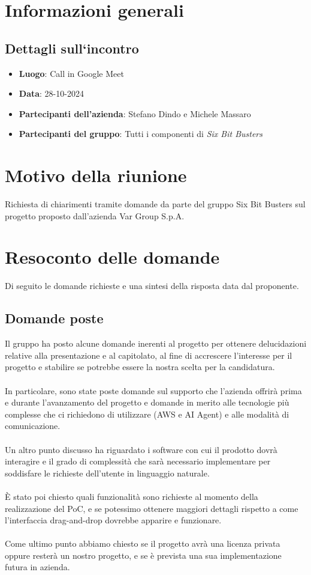 \section{Informazioni generali}
\subsection{Dettagli sull`incontro}
\begin{itemize}
    \item \textbf{Luogo}: Call in Google Meet
    \item \textbf{Data}: 28-10-2024
    \item \textbf{Partecipanti dell'azienda}: Stefano Dindo e Michele Massaro
    \item \textbf{Partecipanti del gruppo}: Tutti i componenti di \textit{Six Bit Busters} 
\end{itemize}

\section{Motivo della riunione}
Richiesta di chiarimenti tramite domande da parte del gruppo Six Bit Busters sul progetto proposto dall'azienda Var Group S.p.A.

\section{Resoconto delle domande}
Di seguito le domande richieste e una sintesi della risposta data dal proponente.

\subsection{Domande poste}
Il gruppo ha posto alcune domande inerenti al progetto per ottenere delucidazioni relative alla presentazione e al capitolato, al fine di accrescere l'interesse per il progetto e stabilire se potrebbe essere la nostra scelta per la candidatura.\\
\\
In particolare, sono state poste domande sul supporto che l’azienda offrirà prima e durante l'avanzamento del progetto e domande in merito alle tecnologie più complesse che ci richiedono di utilizzare (AWS e AI Agent) e alle modalità di comunicazione.\\
\\
Un altro punto discusso ha riguardato i software con cui il prodotto dovrà interagire e il grado di complessità che sarà necessario implementare per soddisfare le richieste dell'utente in linguaggio naturale.\\
\\
È stato poi chiesto quali funzionalità sono richieste al momento della realizzazione del PoC, e se potessimo ottenere maggiori dettagli rispetto a come l'interfaccia drag-and-drop dovrebbe apparire e funzionare.\\
\\
Come ultimo punto abbiamo chiesto se il progetto avrà una licenza privata oppure resterà un nostro progetto, e se è prevista una sua implementazione futura in azienda.

